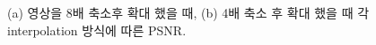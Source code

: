 \documentclass[a4paper, 12p]{paper}
\begin{document}
\begin{figure}[H]
\centering
{}
\caption{(a) 영상을 8배 축소후 확대 했을 때, (b) 4배 축소 후 확대 했을 때 각 interpolation 방식에 따른 PSNR.}

\end{figure}
\end{document}
